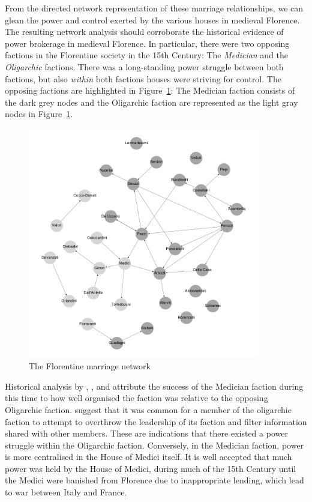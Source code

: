 From the directed network representation of these marriage relationships, we can glean the power and control exerted by the various houses in medieval Florence. The resulting network analysis should corroborate the historical evidence of power brokerage in medieval Florence. In particular, there were two opposing factions in the Florentine society in the 15th Century: The \emph{Medician} and the \emph{Oligarchic} factions. There was a long-standing power struggle between both factions, but also \emph{within} both factions houses were striving for control. The opposing factions are highlighted in Figure~\ref{Flocrit}: The Medician faction consists of the dark grey nodes and the Oligarchic faction are represented as the light gray nodes in Figure~\ref{Flocrit}.
\begin{figure}[h]
\begin{center}
\includegraphics[width=0.9\textwidth]{Images/Florentine-marr.png}
\end{center}
\caption{The Florentine marriage network}
\label{Flocrit}
\end{figure}
Historical analysis by \citet{Roover1946, Roover1963}, \citet{Padgett1993}, and \citet{Goldthwaite2009} attribute the success of the Medician faction during this time to how well organised the faction was relative to the opposing Oligarchic faction. \citet{Padgett1993} suggest that it was common for a member of the oligarchic faction to attempt to overthrow the leadership of its faction and filter information shared with other members. These are indications that there existed a power struggle within the Oligarchic faction. Conversely, in the Medician faction, power is more centralised in the House of Medici itself. It is well accepted that much power was held by the House of Medici, during much of the 15th Century until the Medici were banished from Florence due to inappropriate lending, which lead to war between Italy and France. 

